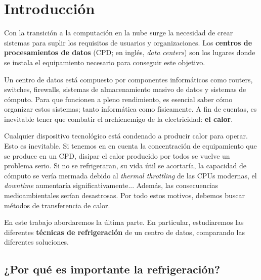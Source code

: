 


\chapter{Introducción}

Con la transición a la computación en la nube surge la necesidad de crear sistemas para suplir los requisitos de usuarios y organizaciones. Los \textbf{centros de procesamientos de datos} (CPD; en inglés, \textit{data centers}) son los lugares donde se instala el equipamiento necesario para conseguir este objetivo.

Un centro de datos está compuesto por componentes informáticos como routers, switches, firewalls, sistemas de almacenamiento masivo de datos y sistemas de cómputo. Para que funcionen a pleno rendimiento, es esencial saber cómo organizar estos sistemas; tanto informática como físicamente. A fin de cuentas, es inevitable tener que combatir el archienemigo de la electricidad: \textbf{el calor}.

Cualquier dispositivo tecnológico está condenado a producir calor para operar. Esto es inevitable. Si tenemos en en cuenta la concentración de equipamiento que se produce en un CPD, disipar el calor producido por todos se vuelve un problema serio. Si no se refrigeraran, su vida útil se acortaría, la capacidad de cómputo se vería mermada debido al \textit{thermal throttling} de las CPUs modernas, el \textit{downtime} aumentaría significativamente... Además, las consecuencias medioambientales serían desastrosas. Por todo estos motivos, debemos buscar métodos de transferencia de calor.


En este trabajo abordaremos la última parte. En particular, estudiaremos las diferentes \textbf{técnicas de refrigeración} de un centro de datos, comparando las diferentes soluciones.

\section{¿Por qué es importante la refrigeración?}


